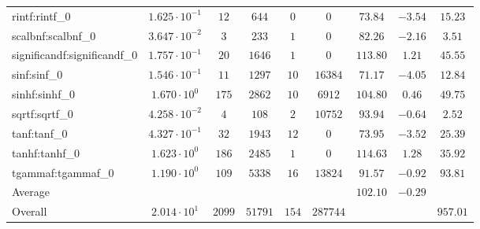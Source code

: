 \begin{tabular}{|l|c|c|c|c|c|c|c|c|}
rintf:rintf\_0               & $ 1.625 \cdot 10^{-1} $ & $ 12     $ & $ 644   $ & $ 0   $ & $ 0      $ & $ 73.84       $ & $ -3.54   $ & $ 15.23   $ \\
scalbnf:scalbnf\_0           & $ 3.647 \cdot 10^{-2} $ & $ 3      $ & $ 233   $ & $ 1   $ & $ 0      $ & $ 82.26       $ & $ -2.16   $ & $ 3.51    $ \\
significandf:significandf\_0 & $ 1.757 \cdot 10^{-1} $ & $ 20     $ & $ 1646  $ & $ 1   $ & $ 0      $ & $ 113.80      $ & $ 1.21    $ & $ 45.55   $ \\
sinf:sinf\_0                 & $ 1.546 \cdot 10^{-1} $ & $ 11     $ & $ 1297  $ & $ 10  $ & $ 16384  $ & $ 71.17       $ & $ -4.05   $ & $ 12.84   $ \\
sinhf:sinhf\_0               & $ 1.670 \cdot 10^{0}  $ & $ 175    $ & $ 2862  $ & $ 10  $ & $ 6912   $ & $ 104.80      $ & $ 0.46    $ & $ 49.75   $ \\
sqrtf:sqrtf\_0               & $ 4.258 \cdot 10^{-2} $ & $ 4      $ & $ 108   $ & $ 2   $ & $ 10752  $ & $ 93.94       $ & $ -0.64   $ & $ 2.52    $ \\
tanf:tanf\_0                 & $ 4.327 \cdot 10^{-1} $ & $ 32     $ & $ 1943  $ & $ 12  $ & $ 0      $ & $ 73.95       $ & $ -3.52   $ & $ 25.39   $ \\
tanhf:tanhf\_0               & $ 1.623 \cdot 10^{0}  $ & $ 186    $ & $ 2485  $ & $ 1   $ & $ 0      $ & $ 114.63      $ & $ 1.28    $ & $ 35.92   $ \\
tgammaf:tgammaf\_0           & $ 1.190 \cdot 10^{0}  $ & $ 109    $ & $ 5338  $ & $ 16  $ & $ 13824  $ & $ 91.57       $ & $ -0.92   $ & $ 93.81   $ \\
\hline
Average                      & $                     $ & $        $ & $       $ & $     $ & $        $ & $ 102.10      $ & $ -0.29   $ & $         $ \\
\hline
Overall                      & $ 2.014 \cdot 10^{1}  $ & $ 2099   $ & $ 51791 $ & $ 154 $ & $ 287744 $ & $             $ & $         $ & $ 957.01  $ \\
\hline
\end{tabular}
